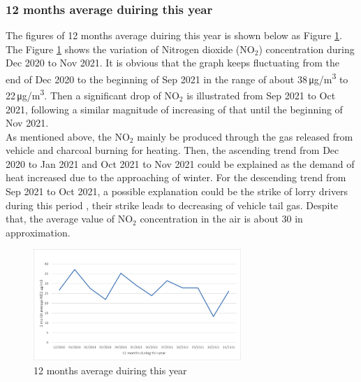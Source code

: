 \documentclass[a4paper,12pt,reqno]{article}
\begin{document}
    \subsubsection*{12 months average duiring this year}
        The figures of 12 months average duiring this year is shown below 
        as Figure \ref{fig:12_months_average_duiring_this_year}.\\
        The Figure \ref{fig:12_months_average_duiring_this_year} shows the variation of Nitrogen dioxide (NO$_2$) 
        concentration during Dec 2020 to Nov 2021. It is obvious 
        that the graph keeps fluctuating from the end of Dec 2020 
        to the beginning of Sep 2021 in the range of about 38\,\si{\ug/\m^3} 
        to 22\,\si{\ug/\m^3}. Then a significant drop of NO$_2$ is illustrated 
        from Sep 2021 to Oct 2021, following a similar magnitude of 
        increasing of that until the beginning of Nov 2021. \\
        As mentioned above, the NO$_2$ mainly be produced through the 
        gas released from vehicle and charcoal burning for heating. 
        Then, the ascending trend from Dec 2020 to Jan 2021 and 
        Oct 2021 to Nov 2021 could be explained as the demand of 
        heat increased due to the approaching of winter. For the 
        descending trend from Sep 2021 to Oct 2021, a possible 
        explanation could be the strike of lorry drivers during 
        this period \cite{Gareth}, their strike leads to decreasing of 
        vehicle tail gas. Despite that, the average value of NO$_2$ 
        concentration in the air is about 30 in approximation.
        \begin{figure}[H]
            \centering
            \includegraphics[width=0.7\textwidth]{figures/figure1.png}
            \caption{12 months average duiring this year}
            \label{fig:12_months_average_duiring_this_year}
        \end{figure}
         
\end{document}
